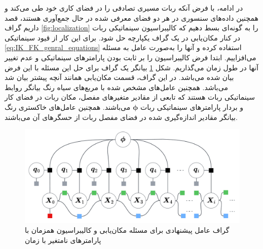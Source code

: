 در ادامه، با فرض آنکه ربات مسیری تصادفی را در فضای کاری خود طی می‌کند و همچنین داده‌های سنسوری در هر دو فضای معرفی شده در حال جمع‌آوری هستند، قصد داریم گراف
\ref{fig:localization}
را به گونه‌ای بسط دهیم که کالیبراسیون سینماتیکی ربات در کنار مکان‌یابی در یک گراف یکپارچه حل شود. برای این کار از قیود سینماتیکی
\ref{eq:IK_FK_genral_equations}
استفاده کرده و آنها را به‌صورت عامل به مسئله می‌افزاییم. ابتدا فرض کالیبراسیون را بر ثابت بودن پارامترهای سینماتیکی و عدم تغییر آنها در طول زمان می‌گذاریم. شکل
\ref{fig:kinematiclocalizationbasic}
بیانگر یک گراف برای حل این مسئله با این فرض بیان شده می‌باشد. در این گراف، قسمت مکان‌یابی همانند آنچه پیشتر بیان شد می‌باشد. همچنین عامل‌های مشخص شده با مربع‌های سیاه رنگ بیانگر روابط سینماتیکی ربات هستند که تابعی از مقادیر متغیرهای مفصل، مکان ربات در فضای کار و بردار پارامترهای سینماتیکی ربات
 $\boldsymbol{\phi}$
 می‌باشند. همچنین عامل‌های خاکستری رنگ بیانگر مقادیر اندازه‌گیری شده در فضای مفصل ربات از حسگرهای آن می‌باشند. 
\begin{figure}
	\centering
	\includegraphics[width=0.7\linewidth]{img/Kinematic_localization_basic}
	\caption{گراف عامل پیشنهادی برای مسئله مکان‌یابی و کالیبراسیون همزمان با پارامتر‌های نامتغیر با زمان}
	\label{fig:kinematiclocalizationbasic}
\end{figure}

